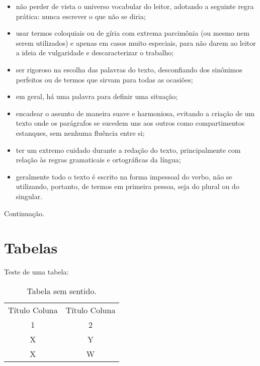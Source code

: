 \begin{itemize}
		\item não perder de vista o universo vocabular do leitor, adotando a seguinte regra prática: nunca escrever o que não se diria;

		\item usar termos coloquiais ou de gíria com extrema parcimônia (ou mesmo nem serem utilizados) e apenas em casos muito especiais, para não darem ao leitor a ideia de vulgaridade e descaracterizar o trabalho;

		\item ser rigoroso na escolha das palavras do texto, desconfiando dos sinônimos perfeitos ou de termos que sirvam para todas as ocasiões;

		\item em geral, há uma palavra para definir uma situação;

		\item encadear o assunto de maneira suave e harmoniosa, evitando a criação de um texto onde os parágrafos se sucedem uns aos outros como compartimentos estanques, sem nenhuma fluência entre si;

		\item ter um extremo cuidado durante a redação do texto, principalmente com relação às regras gramaticais e ortográficas da língua;

		\item geralmente todo o texto é escrito na forma impessoal do verbo, não se utilizando, portanto, de termos em primeira pessoa, seja do plural ou do singular.

	\end{itemize}

	Continuação.
	
	\section{Tabelas}
	
		Teste de uma tabela:

		\begin{table}[htbp]
			\caption{Tabela sem sentido.}
			\label{tabela-ssentido}
			\begin{center}
			\begin{tabular}{|c|c|}
				\hline
				Título Coluna & Título Coluna \\
				1 & 2 \\
				\hline
				X & Y \\
				\hline
				X & W \\
				\hline
			\end{tabular}
			\end{center}
		\end{table}
		
